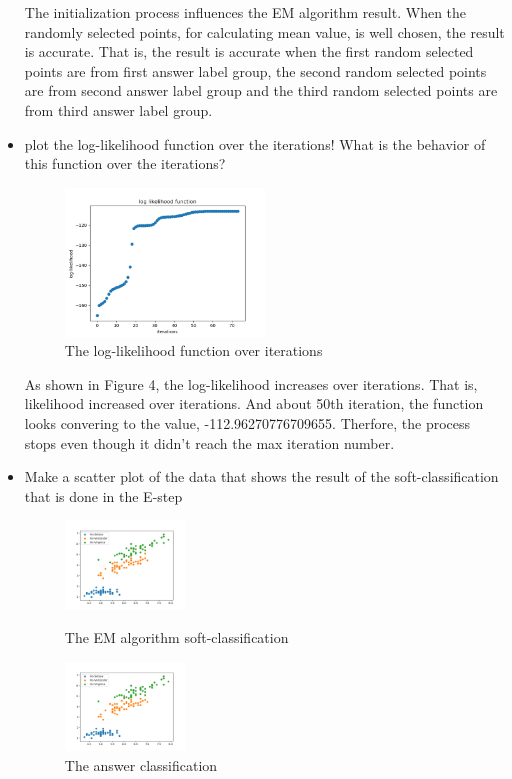 \documentclass[a4paper]{article}
\begin{document}
\begin{itemize}
	The initialization process influences the EM algorithm result. When the randomly selected points, for calculating mean value, is well chosen, the result is accurate. That is, the result is accurate when the first random selected points are from first answer label group, the second random selected points are from second answer label group and the third random selected points are from third answer label group.

	\clearpage
	\item plot the log-likelihood function over the iterations! What is the behavior of this function over the iterations?

	\begin{figure}[h]
		\begin{center}
			\includegraphics[width=0.5\textwidth]{log_likelihood.png}
			\caption{The log-likelihood function over iterations}
		\end{center}
	\end{figure}
	As shown in Figure 4, the log-likelihood increases over iterations. That is, likelihood increased over iterations. And about 50th iteration, the function looks convering to the value, -112.96270776709655. Therfore, the process stops even though it didn't reach the max iteration number.\\

	\item Make a scatter plot of the data that shows the result of the soft-classiﬁcation that is done in the E-step

	\begin{figure}[h]
		\begin{center}
			\includegraphics[width=0.3\textwidth]{3class.png}
			\caption{The EM algorithm soft-classification}
			\includegraphics[width=0.3\textwidth]{answer.png}
			\caption{The answer classification}
		\end{center}
	\end{figure}


\end{itemize}
\end{document}
